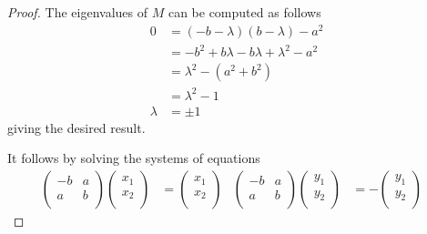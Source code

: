 \documentclass[../psets.tex]{subfiles}
\begin{document}
\begin{enumerate}
\begin{enumerate}
\begin{enumerate}
\begin{proof}
                The eigenvalues of $M$ can be computed as follows
                \begin{align*}
                    0 &= (-b-\lambda)(b-\lambda)-a^2\\
                    &= -b^2+b\lambda-b\lambda+\lambda^2-a^2\\
                    &= \lambda^2-(a^2+b^2)\\
                    &= \lambda^2-1\\
                    \lambda &= \pm 1
                \end{align*}
                giving the desired result.\par
                It follows by solving the systems of equations
                \begin{align*}
                    \begin{pmatrix}
                        -b & a\\
                        a & b\\
                    \end{pmatrix}
                    \begin{pmatrix}
                        x_1\\
                        x_2\\
                    \end{pmatrix}
                    &=
                    \begin{pmatrix}
                        x_1\\
                        x_2\\
                    \end{pmatrix}&
                    \begin{pmatrix}
                        -b & a\\
                        a & b\\
                    \end{pmatrix}
                    \begin{pmatrix}
                        y_1\\
                        y_2\\
                    \end{pmatrix}
                    &= -
                    \begin{pmatrix}
                        y_1\\
                        y_2\\
                    \end{pmatrix}&

\end{align*}
\end{proof}
\end{enumerate}
\end{enumerate}
\end{enumerate}
\end{document}
